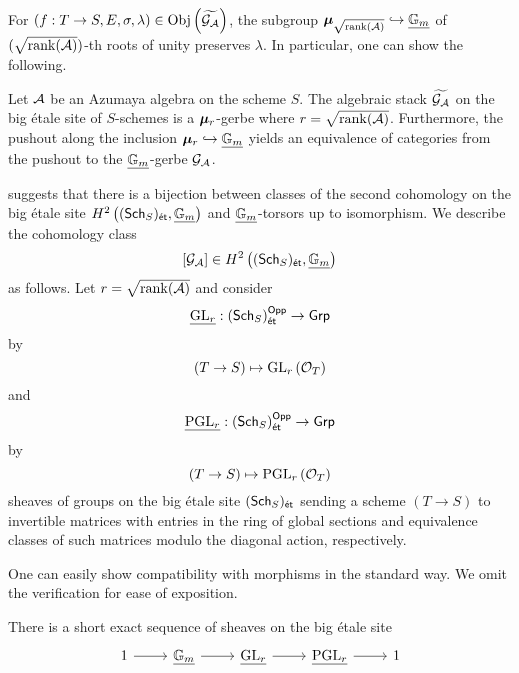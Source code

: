 For $(f:T\to S, E, \sigma, \lambda)\in\mathrm{Obj}\left(\widetilde{\mathcal{G}_{\mathcal{A}}}\right)$, the subgroup $\bm{\mu}_{\sqrt{\mathrm{rank}(\mathcal{A})}}\hookrightarrow\underline{\mathbb{G}_{m}}$ of $(\sqrt{\mathrm{rank}(\mathcal{A})})$-th roots of unity preserves $\lambda$. In particular, one can show the following. 
\begin{proposition}\label{prop: tidle GA is a mu r gerbe}
    Let $\mathcal{A}$ be an Azumaya algebra on the scheme $S$. The algebraic stack $\widetilde{\mathcal{G}_{\mathcal{A}}}$ on the big \'{e}tale site of $S$-schemes is a $\bm{\mu}_{r}$-gerbe where $r=\sqrt{\mathrm{rank}(\mathcal{A})}$. Furthermore, the pushout along the inclusion $\bm{\mu}_{r}\hookrightarrow\underline{\mathbb{G}_{m}}$ yields an equivalence of categories from the pushout to the $\underline{\mathbb{G}_{m}}$-gerbe $\mathcal{G}_{\mathcal{A}}$.
\end{proposition}
 suggests that there is a bijection between classes of the second cohomology on the big \'{e}tale site $H^{2}\left((\mathsf{Sch}_{S})_{\mathsf{\acute{e}t}},\underline{\mathbb{G}_{m}}\right)$ and $\underline{\mathbb{G}_{m}}$-torsors up to isomorphism. We describe the cohomology class 
$$[\mathcal{G}_{\mathcal{A}}]\in H^{2}\left((\mathsf{Sch}_{S})_{\mathsf{\acute{e}t}},\underline{\mathbb{G}_{m}}\right)$$
as follows. Let $r=\sqrt{\mathrm{rank}(\mathcal{A})}$ and consider 
$$\underline{\mathrm{GL}_{r}}:(\mathsf{Sch}_{S})_{\mathsf{\acute{e}t}}^{\mathsf{Opp}}\to\mathsf{Grp}$$
by 
$$(T\to S)\mapsto \mathrm{GL}_{r}\left(\mathcal{O}_{T}\right)$$
and 
$$\underline{\mathrm{PGL}_{r}}:(\mathsf{Sch}_{S})_{\mathsf{\acute{e}t}}^{\mathsf{Opp}}\to\mathsf{Grp}$$
by 
$$(T\to S)\mapsto \mathrm{PGL}_{r}\left(\mathcal{O}_{T}\right)$$
sheaves of groups on the big \'{e}tale site $(\mathsf{Sch}_{S})_{\mathsf{\acute{e}t}}$ sending a scheme $(T\to S)$ to invertible matrices with entries in the ring of global sections and equivalence classes of such matrices modulo the diagonal action, respectively. 
\begin{remark}
    One can easily show compatibility with morphisms in the standard way. We omit the verification for ease of exposition. 
\end{remark}
There is a short exact sequence of sheaves on the big \'{e}tale site 
$$%
\begin{tikzcd}
	1 & {\underline{\GG_{m}}} & {\underline{\mathrm{GL}_{r}}} & {\underline{\mathrm{PGL}_{r}}} & 1
	\arrow[from=1-1, to=1-2]
	\arrow[from=1-2, to=1-3]
	\arrow[from=1-3, to=1-4]
	\arrow[from=1-4, to=1-5]
\end{tikzcd}$$
